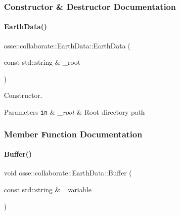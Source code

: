 \subsubsection{Constructor \& Destructor Documentation}
\mbox{\label{classosse_1_1collaborate_1_1_earth_data_a77ce398a29306b84cdddbd937cb62bbd}} 
\paragraph{\texorpdfstring{Earth\+Data()}{EarthData()}}
{\footnotesize\ttfamily osse\+::collaborate\+::\+Earth\+Data\+::\+Earth\+Data (\begin{DoxyParamCaption}\item[{const std\+::string \&}]{\+\_\+root }\end{DoxyParamCaption})\hspace{0.3cm}{\ttfamily [explicit]}}



Constructor. 


\begin{DoxyParams}[1]{Parameters}
\mbox{\tt in}  & {\em \+\_\+root} & Root directory path \\
\hline
\end{DoxyParams}


\subsubsection{Member Function Documentation}
\mbox{\label{classosse_1_1collaborate_1_1_earth_data_a7a00924ea65a5ea68c25fbba2c1d3c9d}} 
\paragraph{\texorpdfstring{Buffer()}{Buffer()}}
{\footnotesize\ttfamily void osse\+::collaborate\+::\+Earth\+Data\+::\+Buffer (\begin{DoxyParamCaption}\item[{const std\+::string \&}]{\+\_\+variable }\end{DoxyParamCaption})\hspace{0.3cm}{\ttfamily [private]}}



